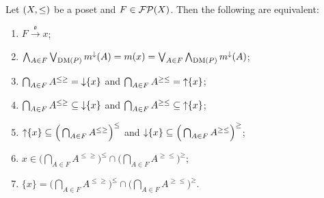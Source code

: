 \begin{proposition} \label{orderConvergenceEquivalents}
Let $\sSet{X,\leq}$ be a poset and $F\in\operatorname{\mathcal{FP}}(X)$. Then
the following are equivalent:
\begin{enumerate}
\item $F\overset{\mathfrak{o}}{\longrightarrow} x$;
\item $\bigwedge_{A\in F}\bigvee_{\operatorname{DM}(P)} m^\downarrow(A) = m(x) = \bigvee_{A\in F}\bigwedge_{\operatorname{DM}(P)} m^\downarrow(A)$;
\item $\bigcap_{A\in F}A^{\leq \geq} = \operatorname{\downarrow} \{x\}$ and $\bigcap_{A\in F}A^{\geq\leq} = \operatorname{\uparrow}\{x\}$;
\item $\bigcap_{A\in F}A^{\leq \geq} \subseteq \operatorname{\downarrow} \{x\}$ and $\bigcap_{A\in F}A^{\geq\leq} \subseteq \operatorname{\uparrow}\{x\}$;
\item $\operatorname{\uparrow}\{x\} \subseteq \Big(\bigcap_{A\in F}A^{\leq \geq}\Big)^\leq$ and $\operatorname{\downarrow}\{x\} \subseteq \Big(\bigcap_{A\in F}A^{\geq \leq}\Big)^\geq$;
\item $x\in \Big(\bigcap_{A\in F}A^{\leq \geq}\Big)^\leq \cap \Big(\bigcap_{A\in F}A^{\geq\leq}\Big)^\geq$;
\item $\{x\} = \Big(\bigcap_{A\in F}A^{\leq \geq}\Big)^\leq \cap \Big(\bigcap_{A\in F}A^{\geq\leq}\Big)^\geq$.
\end{enumerate}
\end{proposition}
